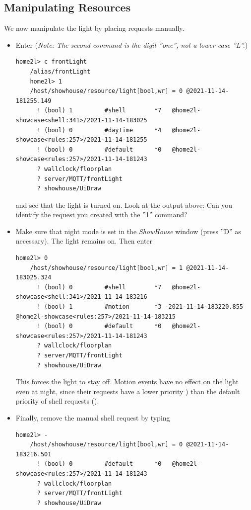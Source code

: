 \documentclass[12pt,english,parskip=half,headheight=19pt]{scrreprt}
\newcommand{\lst}[1]{\colorbox{lstbackground}{\footnotesize\code{#1}}}
\begin{document}
\subsection{Manipulating Resources}
\label{sec:tutorial-shell-manipulate}


We now manipulate the light by placing requests manually.

\begin{itemize}[$\blacktriangleright$]

\item
  Enter (\textit{Note: The second command is the digit ''one'', not a
  lower-case ''L''.})
  \begin{lstlisting}[language=home2l]
    home2l> c frontLight
    /alias/frontLight
    home2l> 1
    /host/showhouse/resource/light[bool,wr] = 0 @2021-11-14-181255.149
      ! (bool) 1         #shell        *7   @home2l-showcase<shell:341>/2021-11-14-183025
      ! (bool) 0         #daytime      *4   @home2l-showcase<rules:257>/2021-11-14-181255
      ! (bool) 0         #default      *0   @home2l-showcase<rules:257>/2021-11-14-181243
      ? wallclock/floorplan
      ? server/MQTT/frontLight
      ? showhouse/UiDraw
  \end{lstlisting}
  and see that the light is turned on. Look at the output above: Can you
  identify the request you created with the ''1'' command?

\item
  Make sure that night mode is set in the \textit{ShowHouse} window (press ''D'' as necessary). The
  light remains on. Then enter
  \begin{lstlisting}[language=home2l]
    home2l> 0
    /host/showhouse/resource/light[bool,wr] = 1 @2021-11-14-183025.324
      ! (bool) 0         #shell        *7   @home2l-showcase<shell:341>/2021-11-14-183216
      ! (bool) 1         #motion       *3 -2021-11-14-183220.855   @home2l-showcase<rules:257>/2021-11-14-183215
      ! (bool) 0         #default      *0   @home2l-showcase<rules:257>/2021-11-14-181243
      ? wallclock/floorplan
      ? server/MQTT/frontLight
      ? showhouse/UiDraw
  \end{lstlisting}
  This forces the light to stay off. Motion events have no effect on the
  light even at night, since their requests have a lower priority
  \lst{*3}) than the default priority of shell requests (\lst{*7}).

\item
  Finally, remove the manual shell request by typing
  \begin{lstlisting}[language=home2l]
    home2l> -
    /host/showhouse/resource/light[bool,wr] = 0 @2021-11-14-183216.501
      ! (bool) 0         #default      *0   @home2l-showcase<rules:257>/2021-11-14-181243
      ? wallclock/floorplan
      ? server/MQTT/frontLight
      ? showhouse/UiDraw
  \end{lstlisting}

\end{itemize}
\end{document}
